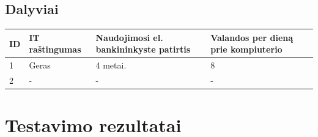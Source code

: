 \documentclass[oneside]{VUMIFPSkursinis}
\begin{document}
\subsection{Dalyviai}
\begin{center}
	\begin{tabular}{ |p{1cm} | p{3cm} | p{5cm} | p{5cm} |}
	\hline
ID&IT raštingumas & Naudojimosi el. bankininkyste patirtis & Valandos per dieną prie kompiuterio\\ \hline
1&Geras&4 metai.&8 \\ \hline
2&-&-&- \\ \hline
\end{tabular}
\end{center}

\section{Testavimo rezultatai}
\end{document}
